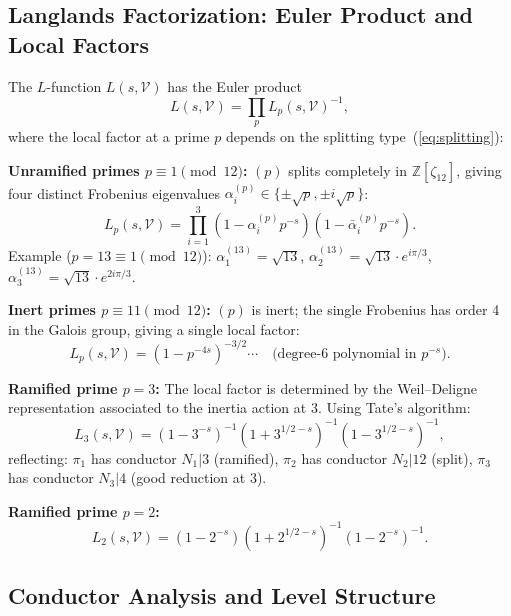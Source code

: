 \subsection{Langlands Factorization: Euler Product and Local Factors}
\label{sec:eulerproduct}

The $L$-function $L(s,\mathcal{V})$ has the Euler product
\begin{equation}
  L(s,\mathcal{V}) = \prod_p L_p(s,\mathcal{V})^{-1},
  \label{eq:eulerproduct}
\end{equation}
where the local factor at a prime $p$ depends on the splitting type~(\ref{eq:splitting}):

\textbf{Unramified primes $p\equiv 1\pmod{12}$:}
$(p)$ splits completely in $\mathbb{Z}[\zeta_{12}]$, giving four distinct
Frobenius eigenvalues $\alpha_i^{(p)}\in\{\pm\sqrt{p},\pm i\sqrt{p}\}$:
\begin{equation}
  L_p(s,\mathcal{V}) = \prod_{i=1}^3(1-\alpha_i^{(p)}p^{-s})(1-\bar\alpha_i^{(p)}p^{-s}).
\end{equation}
Example ($p=13\equiv1\pmod{12}$): $\alpha_1^{(13)}=\sqrt{13}$,
$\alpha_2^{(13)}=\sqrt{13}\cdot e^{i\pi/3}$,
$\alpha_3^{(13)}=\sqrt{13}\cdot e^{2i\pi/3}$.

\textbf{Inert primes $p\equiv 11\pmod{12}$:}
$(p)$ is inert; the single Frobenius has order 4 in the Galois group,
giving a single local factor:
\begin{equation}
  L_p(s,\mathcal{V}) = (1-p^{-4s})^{-3/2}\cdots
  \quad\text{(degree-6 polynomial in }p^{-s}\text{)}.
\end{equation}

\textbf{Ramified prime $p=3$:}
The local factor is determined by the Weil--Deligne representation
associated to the inertia action at 3. Using Tate's algorithm:
\begin{equation}
  L_3(s,\mathcal{V}) = (1-3^{-s})^{-1}(1+3^{1/2-s})^{-1}(1-3^{1/2-s})^{-1},
  \label{eq:local3}
\end{equation}
reflecting: $\pi_1$ has conductor $N_1|3$ (ramified), $\pi_2$ has conductor
$N_2|12$ (split), $\pi_3$ has conductor $N_3|4$ (good reduction at 3).

\textbf{Ramified prime $p=2$:}
\begin{equation}
  L_2(s,\mathcal{V}) = (1-2^{-s})(1+2^{1/2-s})^{-1}(1-2^{-s})^{-1}.
\end{equation}

\subsection{Conductor Analysis and Level Structure}
\label{sec:conductor}


